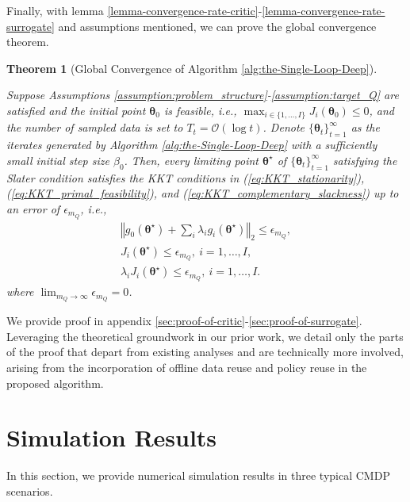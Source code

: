 \documentclass{IEEEtran}
\newtheorem{theorem}{Theorem}
\begin{document}
Finally, with lemma \ref{lemma-convergence-rate-critic}-\ref{lemma-convergence-rate-surrogate} and assumptions mentioned, we can prove the global convergence theorem. 


\begin{theorem}[Global Convergence of Algorithm \ref{alg:the-Single-Loop-Deep}]~
\label{Theorem:GlobalConvergence}

Suppose Assumptions \ref{assumption:problem_structure}-\ref{assumption:target_Q} are satisfied and the initial point $\boldsymbol{\theta}_{0}$ is feasible, i.e., $\max_{i\in\{1,\ldots,I\}}J_{i}\!\left(\boldsymbol{\theta}_{0}\right)\leq0$, and the number of sampled data is set to $T_{t}=\mathcal{O}(\log t)$. Denote $\{\boldsymbol{\theta}_{t}\}_{t=1}^{\infty}$ as the iterates generated by Algorithm \ref{alg:the-Single-Loop-Deep} with a sufficiently small initial step size $\beta_{0}$. Then, every limiting point $\boldsymbol{\theta}^{\star}$ of $\{\boldsymbol{\theta}_{t}\}_{t=1}^{\infty}$ satisfying the Slater condition satisfies the KKT conditions in (\ref{eq:KKT_stationarity}), (\ref{eq:KKT_primal_feasibility}), and (\ref{eq:KKT_complementary_slackness}) up to an error of $\epsilon_{m_{Q}}$, i.e.,
\begin{gather}
\left\Vert g_{0}\!\left(\boldsymbol{\theta}^{\star}\right)+\sum_{i}\lambda_{i}g_{i}\!\left(\boldsymbol{\theta}^{\star}\right)\right\Vert _{2}\leq\epsilon_{m_{Q}},\label{eq:global_conv_stationarity_residual}\\
J_{i}\!\left(\boldsymbol{\theta}^{\star}\right)\leq\epsilon_{m_{Q}},\ i=1,\ldots,I,\label{eq:global_conv_primal_residual}\\
\lambda_{i}J_{i}\!\left(\boldsymbol{\theta}^{\star}\right)\leq\epsilon_{m_{Q}},\ i=1,\ldots,I.\label{eq:global_conv_complement_residual}
\end{gather}
where $\lim_{m_{Q}\rightarrow\infty}\epsilon_{m_{Q}}=0$.
\end{theorem}

We provide proof in appendix \ref{sec:proof-of-critic}-\ref{sec:proof-of-surrogate}. Leveraging the theoretical groundwork in our prior work, we detail only the parts of the proof that depart from existing analyses and are technically more involved, arising from the incorporation of offline data reuse and policy reuse in the proposed algorithm. 

\section{Simulation Results}
In this section, we provide numerical simulation results in three typical CMDP scenarios.  
\end{document}
